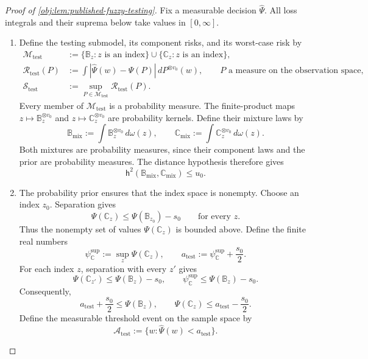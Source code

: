 \begin{proof}[Proof of \cref{obj:lem:published-fuzzy-testing}]
Fix a measurable decision \(\widehat\Psi\). All loss integrals and their suprema below take values in \([0,\infty]\).

\begin{enumerate}
\item Define the testing submodel, its component risks, and its worst-case risk by
\[
\begin{aligned}
\mathcal M_{\mathrm{test}}
&:=\{\mathbb B_z:z\text{ is an index}\}
  \cup\{\mathbb C_z:z\text{ is an index}\},\\
\mathcal R_{\mathrm{test}}(P)
&:=\int
  |\widehat\Psi(w)-\Psi(P)|\,dP^{\otimes v_0}(w),
  \qquad P\text{ a measure on the observation space},\\
\mathcal S_{\mathrm{test}}
&:=\sup_{P\in\mathcal M_{\mathrm{test}}}
  \mathcal R_{\mathrm{test}}(P).
\end{aligned}
\]
Every member of \(\mathcal M_{\mathrm{test}}\) is a probability measure. The finite-product maps
\(z\mapsto\mathbb B_z^{\otimes v_0}\) and
\(z\mapsto\mathbb C_z^{\otimes v_0}\) are probability kernels. Define their mixture laws by
\[
\mathbb B_{\mathrm{mix}}
:=\int\mathbb B_z^{\otimes v_0}\,d\omega(z),
\qquad
\mathbb C_{\mathrm{mix}}
:=\int\mathbb C_z^{\otimes v_0}\,d\omega(z).
\]
Both mixtures are probability measures, since their component laws and the prior are probability measures. The distance hypothesis therefore gives
\[
\mathsf h^2(\mathbb B_{\mathrm{mix}},\mathbb C_{\mathrm{mix}})
\le u_0.
\]

\item The probability prior ensures that the index space is nonempty. Choose an index \(z_0\). Separation gives
\[
\Psi(\mathbb C_z)\le \Psi(\mathbb B_{z_0})-s_0
\qquad\text{for every }z.
\]
Thus the nonempty set of values \(\Psi(\mathbb C_z)\) is bounded above. Define the finite real numbers
\[
\psi_{\mathbb C}^{\mathrm{sup}}
:=\sup_z\Psi(\mathbb C_z),
\qquad
a_{\mathrm{test}}
:=\psi_{\mathbb C}^{\mathrm{sup}}+\frac{s_0}{2}.
\]
For each index \(z\), separation with every \(z'\) gives
\[
\Psi(\mathbb C_{z'})
\le\Psi(\mathbb B_z)-s_0,
\qquad
\psi_{\mathbb C}^{\mathrm{sup}}
\le\Psi(\mathbb B_z)-s_0.
\]
Consequently,
\[
a_{\mathrm{test}}+\frac{s_0}{2}
\le\Psi(\mathbb B_z),
\qquad
\Psi(\mathbb C_z)
\le a_{\mathrm{test}}-\frac{s_0}{2}.
\]
Define the measurable threshold event on the sample space by
\[
\mathcal A_{\mathrm{test}}
:=\{w:\widehat\Psi(w)<a_{\mathrm{test}}\}.
\]


\end{enumerate}
\end{proof}
